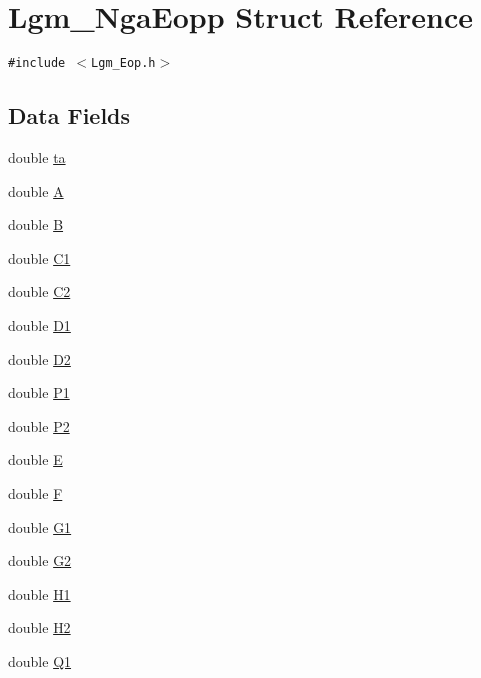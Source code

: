 \hypertarget{struct_lgm___nga_eopp}{
\section{Lgm\_\-NgaEopp Struct Reference}
\label{struct_lgm___nga_eopp}
}
{\tt \#include $<$Lgm\_\-Eop.h$>$}

\subsection*{Data Fields}
\begin{CompactItemize}
\item 
double \hyperlink{struct_lgm___nga_eopp_dca44f25fa586684a49891f7d5b58ca1}{ta}
\item 
double \hyperlink{struct_lgm___nga_eopp_2941385b1be5280d3b1f546356f7ec99}{A}
\item 
double \hyperlink{struct_lgm___nga_eopp_df085adbf76beb194ac436d42cd1d725}{B}
\item 
double \hyperlink{struct_lgm___nga_eopp_d69d2b382d336189251f264999f56bfa}{C1}
\item 
double \hyperlink{struct_lgm___nga_eopp_666af5280f39c3ddcafb7c01e55192a2}{C2}
\item 
double \hyperlink{struct_lgm___nga_eopp_98190861f5c5ac1bb59aaf713ede0023}{D1}
\item 
double \hyperlink{struct_lgm___nga_eopp_09d4b3eb759f7ace4ea7b734751de4d5}{D2}
\item 
double \hyperlink{struct_lgm___nga_eopp_4c5be5bc2ea5a16617dd95b7d38d288d}{P1}
\item 
double \hyperlink{struct_lgm___nga_eopp_852164d2426de96766457e8d648911d4}{P2}
\item 
double \hyperlink{struct_lgm___nga_eopp_1eb62b8cb1f5e5f571d51179718e7d4c}{E}
\item 
double \hyperlink{struct_lgm___nga_eopp_e3520ebb3ff8d6feab3e6afb47ed4040}{F}
\item 
double \hyperlink{struct_lgm___nga_eopp_f7e0bafaf7137cdfe22fad3458770bbc}{G1}
\item 
double \hyperlink{struct_lgm___nga_eopp_0039b6c763d839473c0f91c2d3fb1586}{G2}
\item 
double \hyperlink{struct_lgm___nga_eopp_fa5f25beeda3aece1803a92b64262dab}{H1}
\item 
double \hyperlink{struct_lgm___nga_eopp_ab6041131b2e33076efab27de0a33da9}{H2}
\item 
double \hyperlink{struct_lgm___nga_eopp_ec6b688f140cf83474744af7c64ea797}{Q1}

\end{CompactItemize}
